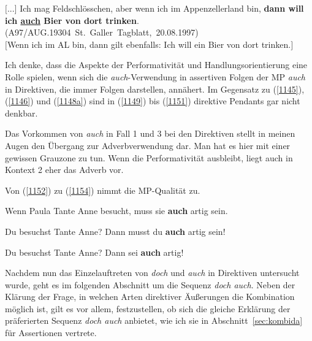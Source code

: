{\begin{exe}
	\ex\label{1151} 
	\scriptsize
	{\glqq $[$...$]$ Ich mag Feldschlösschen, aber wenn ich im Appenzellerland bin, \textbf{dann will ich \underline{auch} Bier von dort trinken}.\grqq{}   
	\hfill\hbox{(A97/AUG.19304 St. Galler Tagblatt, 20.08.1997)}}\\
	$[$Wenn ich im AL bin, dann gilt ebenfalls: Ich will ein Bier von dort trinken.$]$
\end{exe}
Ich denke, dass die Aspekte der Performativität und Handlungsorientierung eine Rolle spielen, wenn sich die \textit{auch}-Verwendung in assertiven Folgen der MP \textit{auch} in Direktiven, die immer Folgen darstellen, annähert. Im Gegensatz zu (\ref{1145}), (\ref{1146}) und (\ref{1148a}) sind in (\ref{1149}) bis (\ref{1151}) direktive Pendants gar nicht denkbar.

Das Vorkommen von \textit{auch} in Fall 1 und 3 bei den Direktiven stellt in meinen Augen den Übergang zur Adverbverwendung dar. Man hat es hier mit einer gewissen Grauzone zu tun. Wenn die Performativität ausbleibt, liegt auch in Kontext 2 eher das Adverb vor. 

Von (\ref{1152}) zu (\ref{1154}) nimmt die MP-Qualität zu.
	
\begin{exe}
	\ex\label{1152} 
	Wenn Paula Tante Anne besucht, muss sie \textbf{auch} artig sein.
\end{exe}	
\vspace{-0.6cm}	
\begin{exe}
	\ex\label{1153} 
	Du besuchst Tante Anne? Dann musst du \textbf{auch} artig sein!
\end{exe}	
\vspace{-0.6cm}
\begin{exe}
	\ex\label{1154} 
	Du besuchst Tante Anne? Dann sei \textbf{auch} artig!
\end{exe}	
Nachdem nun das Einzelauftreten von \textit{doch} und \textit{auch} in Direktiven untersucht wurde, geht es im folgenden Abschnitt um die Sequenz \textit{doch auch}. Neben der Klärung der Frage, in welchen Arten direktiver Äußerungen die Kombination möglich ist, gilt es vor allem, festzustellen, ob sich die glei\-che Erklärung der präferierten Sequenz \textit{doch auch} anbietet, wie ich sie in Abschnitt~\ref{sec:kombida} für Assertionen vertrete. 

}
